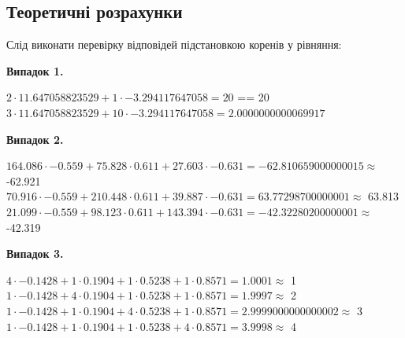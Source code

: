 \documentclass[a4paper,12pt]{extarticle}
\begin{document}
\subsection{Теоретичні розрахунки}
Слід виконати перевірку відповідей підстановкою коренів у рівняння:

\textbf{Випадок 1.}
\newcommand{\x}{11.647058823529}
\newcommand{\y}{-3.294117647058}

$2 \cdot \x + 1 \cdot \y = 20$ == 20 \\
$3 \cdot \x + 10 \cdot \y = 2.0000000000069917$ 

\textbf{Випадок 2.}
\renewcommand{\x}{-0.559}
\renewcommand{\y}{0.611}
\newcommand{\z}{-0.631}

$164.086 \cdot \x + 75.828 \cdot \y + 27.603 \cdot \z = -62.810659000000015 \approx$ -62.921 \\
$70.916 \cdot \x + 210.448 \cdot \y + 39.887 \cdot \z = 63.77298700000001 \approx$ 63.813 \\
$21.099 \cdot \x + 98.123 \cdot \y + 143.394 \cdot \z = -42.32280200000001 \approx$ -42.319

\textbf{Випадок 3.}
\renewcommand{\x}{-0.1428}
\renewcommand{\y}{0.1904}
\renewcommand{\z}{0.5238}
\newcommand{\w}{0.8571}

$4 \cdot \x + 1 \cdot \y + 1 \cdot \z + 1 \cdot \w = 1.0001 \approx$ 1 \\
$1 \cdot \x + 4 \cdot \y + 1 \cdot \z + 1 \cdot \w = 1.9997 \approx$ 2 \\
$1 \cdot \x + 1 \cdot \y + 4 \cdot \z + 1 \cdot \w = 2.9999000000000002 \approx$ 3 \\
$1 \cdot \x + 1 \cdot \y + 1 \cdot \z + 4 \cdot \w = 3.9998 \approx$ 4
\end{document}
